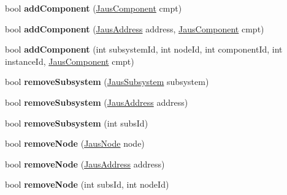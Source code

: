 \begin{DoxyCompactItemize}
\item 
\hypertarget{class_system_tree_a0ee9747f800da31fbf82829acd7d8087}{bool {\bfseries add\-Component} (\hyperlink{struct_jaus_component_struct}{\-Jaus\-Component} cmpt)}\label{class_system_tree_a0ee9747f800da31fbf82829acd7d8087}

\item 
\hypertarget{class_system_tree_a529544afd618e352da4f96e4423a2014}{bool {\bfseries add\-Component} (\hyperlink{struct_jaus_address_struct}{\-Jaus\-Address} address, \hyperlink{struct_jaus_component_struct}{\-Jaus\-Component} cmpt)}\label{class_system_tree_a529544afd618e352da4f96e4423a2014}

\item 
\hypertarget{class_system_tree_a5ac1ea5f6b43326108428f0e7c894d60}{bool {\bfseries add\-Component} (int subsystem\-Id, int node\-Id, int component\-Id, int instance\-Id, \hyperlink{struct_jaus_component_struct}{\-Jaus\-Component} cmpt)}\label{class_system_tree_a5ac1ea5f6b43326108428f0e7c894d60}

\item 
\hypertarget{class_system_tree_ae2df134d1a4902ba676f664f4151b399}{bool {\bfseries remove\-Subsystem} (\hyperlink{struct_jaus_subsystem_struct}{\-Jaus\-Subsystem} subsystem)}\label{class_system_tree_ae2df134d1a4902ba676f664f4151b399}

\item 
\hypertarget{class_system_tree_a517872a4766cce89e05bba33d4a012c0}{bool {\bfseries remove\-Subsystem} (\hyperlink{struct_jaus_address_struct}{\-Jaus\-Address} address)}\label{class_system_tree_a517872a4766cce89e05bba33d4a012c0}

\item 
\hypertarget{class_system_tree_a74362a3ea074271e8d847da8c1099e30}{bool {\bfseries remove\-Subsystem} (int subs\-Id)}\label{class_system_tree_a74362a3ea074271e8d847da8c1099e30}

\item 
\hypertarget{class_system_tree_a0fbee2e0c132355d675587f5cf1e64ab}{bool {\bfseries remove\-Node} (\hyperlink{struct_jaus_node_struct}{\-Jaus\-Node} node)}\label{class_system_tree_a0fbee2e0c132355d675587f5cf1e64ab}

\item 
\hypertarget{class_system_tree_a6b97676995c003ac69777b4337702923}{bool {\bfseries remove\-Node} (\hyperlink{struct_jaus_address_struct}{\-Jaus\-Address} address)}\label{class_system_tree_a6b97676995c003ac69777b4337702923}

\item 
\hypertarget{class_system_tree_a4194d8a90fb7a5f4a54244f152f5cf6c}{bool {\bfseries remove\-Node} (int subs\-Id, int node\-Id)}\label{class_system_tree_a4194d8a90fb7a5f4a54244f152f5cf6c}


\end{DoxyCompactItemize}

